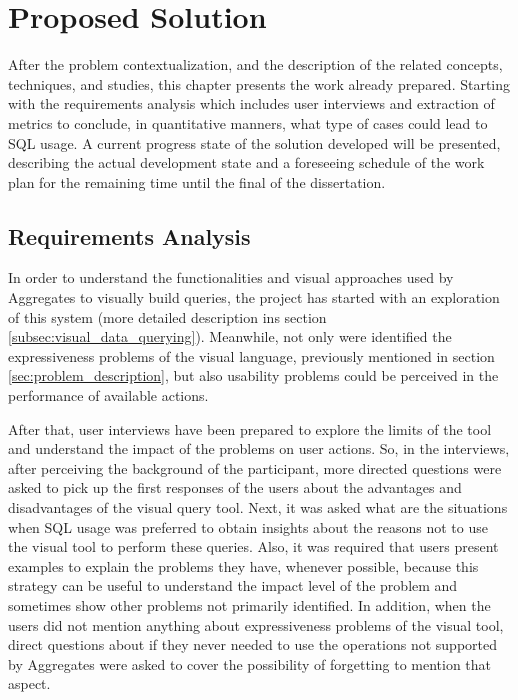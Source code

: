 \chapter{Proposed Solution}
\label{cha:proposed_solution}
After the problem contextualization, and the description of the related concepts, techniques, and studies, this chapter presents the work already prepared. Starting with the requirements analysis which includes user interviews and extraction of metrics to conclude, in quantitative manners, what type of cases could lead to SQL usage. A current progress state of the solution developed will be presented, describing the actual development state and a foreseeing schedule of the work plan for the remaining time until the final of the dissertation.

\section{Requirements Analysis}
\label{sec:requirements_analysis}
In order to understand the functionalities and visual approaches used by Aggregates to visually build queries, the project has started with an exploration of this system (more detailed description ins section \ref{subsec:visual_data_querying}). Meanwhile, not only were identified the expressiveness problems of the visual language, previously mentioned in section \ref{sec:problem_description}, but also usability problems could be perceived in the performance of available actions. 

After that, user interviews have been prepared to explore the limits of the tool and understand the impact of the problems on user actions. So, in the interviews, after perceiving the background of the participant, more directed questions were asked to pick up the first responses of the users about the advantages and disadvantages of the visual query tool. Next, it was asked what are the situations when SQL usage was preferred to obtain insights about the reasons not to use the visual tool to perform these queries. Also, it was required that users present examples to explain the problems they have, whenever possible, because this strategy can be useful to understand the impact level of the problem and sometimes show other problems not primarily identified. In addition, when the users did not mention anything about expressiveness problems of the visual tool, direct questions about if they never needed to use the operations not supported by Aggregates were asked to cover the possibility of forgetting to mention that aspect.

